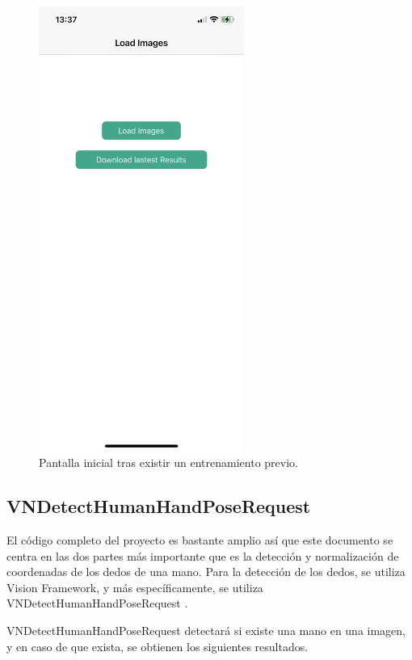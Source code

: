 \documentclass[../main.tex]{subfiles}
\begin{document}
    \begin{figure}[h]
    \centering 
    \includegraphics[width=0.6\textwidth]{images/trainingapp/trainingapp4.PNG}
    \caption{Pantalla inicial tras existir un entrenamiento previo.}
    \label{figure9}
    \end{figure}
    
\subsection{VNDetectHumanHandPoseRequest}

El código completo del proyecto es bastante amplio así que este documento se centra en las dos partes más importante que es la detección y normalización de coordenadas de los dedos de una mano. Para la detección de los dedos, se utiliza Vision Framework, y más específicamente, se utiliza VNDetectHumanHandPoseRequest \cite{handposerequest}.

VNDetectHumanHandPoseRequest detectará si existe una mano en una imagen, y en caso de que exista, se obtienen los siguientes resultados.
\end{document}
